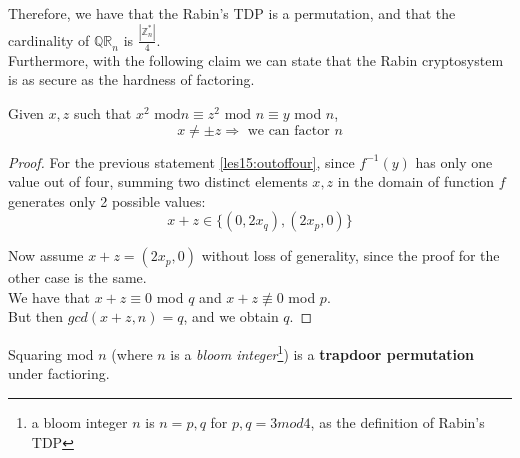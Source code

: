 Therefore, we have that the Rabin's TDP is a permutation, and that the
cardinality of $ \mathbb{QR}_{n} $ is $\frac{|\mathbb{Z}^{*}_{n} |}{4}$.\\

Furthermore, with the following claim we can state that the Rabin cryptosystem
is as secure as the hardness of factoring.

\begin{claim}
    Given $x, z$ such that $x^{2}\text{ mod} n \equiv z^{2} \text{ mod } n
    \equiv y$ mod $n$,
\[
    x\not= \pm z \Rightarrow \text{ we can factor } n
\]
\end{claim}
\begin{proof}
    For the previous statement \ref{les15:outoffour}, since $f^{-1}(y)$
    has only one value out of four, summing two distinct elements $x, z$
    in the domain of function $f$ generates only 2 possible values:
    \[
        x + z \in \{(0,2x_{q}), (2x_{p}, 0)\}
    \]

    Now assume $x + z = (2x_{p}, 0)$ without loss of generality, since the proof
    for the other case is the same.\\
    We have that $x+z \equiv 0$ mod $q$ and $x+z \not\equiv 0 $ mod $p$.\\

    But then $gcd( x+z , n)=q$, and we obtain $q$.
\end{proof}

\begin{theorem}
    Squaring mod $n$ (where $n$ is a \textit{bloom integer}\footnote{ a bloom
    integer $n$ is $n=p,q$ for $p,q=3 mod 4$, as the definition of Rabin's TDP})
    is a \textbf{trapdoor permutation} under factioring.
\end{theorem}

